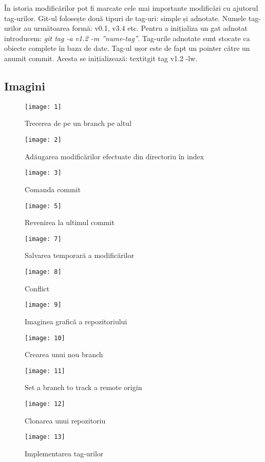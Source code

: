 	În istoria modificărilor pot fi marcate cele mai importante modificări cu ajutorul tag-urilor. Git-ul folosește două tipuri de tag-uri: simple și adnotate. Numele tag-urilor au următoarea formă: v0.1, v3.4 etc. Pentru a inițializa un gat adnotat introducem: \textit{git tag -a v1.2 -m ”nume-tag”}. Tag-urile adnotate sunt stocate ca obiecte complete în baza de date. Tag-ul ușor este de fapt un pointer către un anumit commit. Acesta se inițializează: textit{git tag v1.2 -lw}.
	
	
\subsection{Imagini}
\begin{figure}[h]
\texttt{[image: 1]}
\caption{Trecerea de pe un branch pe altul}
\label{fig:1}
\end{figure}

\begin{figure}[h]
\texttt{[image: 2]}
\caption{Adăugarea modificărilor efectuate din directoriu în index}
\label{fig:2}
\end{figure}

\begin{figure}[h]
\texttt{[image: 3]}
\caption{Comanda commit}
\label{fig:3}
\end{figure}

\begin{figure}[h]
\texttt{[image: 5]}
\caption{Revenirea la ultimul commit}
\label{fig:4}
\end{figure}

\begin{figure}[h]
\texttt{[image: 7]}
\caption{Salvarea temporară a modificărilor}
\label{fig:5}
\end{figure}

\begin{figure}[h]
\texttt{[image: 8]}
\caption{Conflict}
\label{fig:6}
\end{figure}

\begin{figure}[h]
\texttt{[image: 9]}
\caption{Imaginea grafică a repozitoriului}
\label{fig:7}
\end{figure}

\begin{figure}[h]
\texttt{[image: 10]}
\caption{Crearea unui nou branch}
\label{fig:8}
\end{figure}

\begin{figure}[h]
\texttt{[image: 11]}
\caption{Set a branch to track a remote origin}
\label{fig:9}
\end{figure}

\begin{figure}[h]
\texttt{[image: 12]}
\caption{Clonarea unui repozitoriu}
\label{fig:10}
\end{figure}

\begin{figure}[h]
\texttt{[image: 13]}
\caption{Implementarea tag-urilor}
\label{fig:11}
\end{figure}
\clearpage